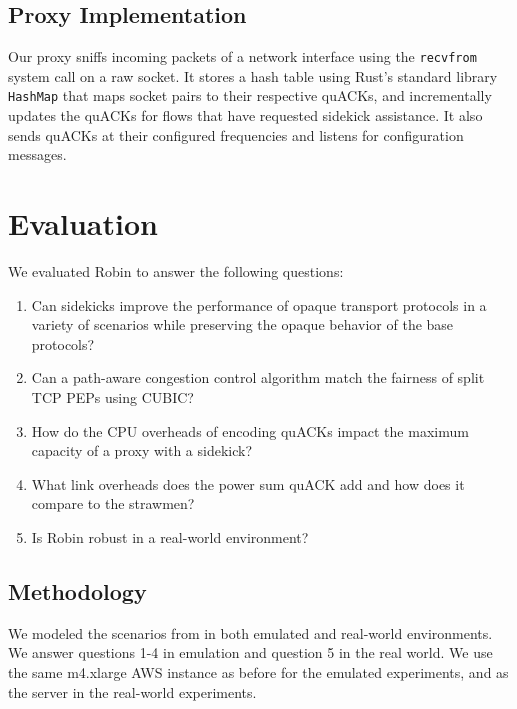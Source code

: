 \subsection{Proxy Implementation}

Our proxy sniffs incoming packets of a network interface using the
\texttt{recvfrom} system call on a raw socket.
It stores a hash table using Rust's standard library \texttt{HashMap} that maps
socket pairs to their respective quACKs, and
incrementally updates the quACKs for flows that have requested sidekick assistance.
It also sends quACKs at their configured frequencies and listens for
configuration messages.

\section{Evaluation}




We evaluated Robin to answer the following questions:
\begin{enumerate}[noitemsep,topsep=0pt]
	\item Can sidekicks improve the performance of opaque transport protocols
	in a variety of scenarios while preserving the opaque behavior of the
	base protocols?
	\item Can a path-aware congestion control algorithm match the fairness of
	split TCP PEPs using CUBIC?
	\item How do the CPU overheads of encoding quACKs impact the maximum
	capacity of a proxy with a sidekick?
	\item What link overheads does the power sum quACK add and how does it
	compare to the strawmen?
	\item Is Robin robust in a real-world environment?
\end{enumerate}

\subsection{Methodology}

We modeled the scenarios from  in both
emulated and real-world environments. We answer questions 1-4 in emulation
and question 5 in the real world. We use the same m4.xlarge AWS instance
as before for the emulated experiments, and as the server in the real-world
experiments.

